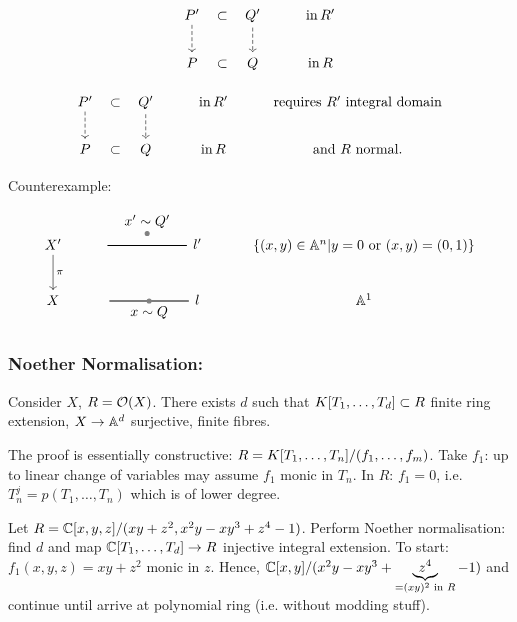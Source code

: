 \documentclass[a4paper,11pt]{article}
\begin{document}
{					
					\begin{equation*}
						\begin{tikzcd}
							P^\prime\ar[d,dashed]\ar[r,phantom,"\subset",description,black] & {\color{black}Q^\prime}\ar[d,dashed,black] & \mathrm{in}\, R^\prime\\
							P\ar[r,phantom,"\subset",description] & Q & \mathrm{in}\,R
						\end{tikzcd}
					\end{equation*}

					\begin{equation*}
						\begin{tikzcd}
							{\color{black}P^\prime}\ar[d,dashed,black]\ar[r,phantom,"\subset",description,black] & Q^\prime\ar[d,dashed] & \mathrm{in}\, R^\prime & \text{requires }R^\prime\text{ integral domain}\\
							P\ar[r,phantom,"\subset",description] & Q & \mathrm{in}\,R & \text{and } R \text{ normal}.
						\end{tikzcd}
					\end{equation*}

					Counterexample:
					\begin{equation*}
						\begin{tikzcd}
							X^\prime\ar[d,"\pi"] & \tikz[baseline=-.1cm]{\draw[thick](-1,0)--(1,0);\draw[thick,fill,gray](0,.3)circle[radius=.05cm];\node[above] at (0,.3){$x^\prime\sim Q^\prime$};\node[right] at (1,0){$l^\prime$}} & \{(x,y)\in\AA^n|y=0\text{ or }(x,y)=(0,1)\}\\
							X & \tikz[baseline=-.1cm]{\draw[thick](-1,0)--(1,0);\draw[thick,fill,gray](0,0)circle[radius=.05cm];\node[below] at (0,0){$x\sim Q$};\node[right] at (1,0){$l$}} & \AA^1
						\end{tikzcd}
					\end{equation*}

				\subsubsection*{Noether Normalisation:}

					Consider $X$, $R=\O(X)$. There exists $d$ such that $\K[d]\subset R$ finite ring extension, $X\rightarrow\AA^d$ surjective, finite fibres.
					
					\begin{remark}
						The proof is essentially constructive: $R=\K/(f_1,\dots,f_m)$. Take $f_1$: up to linear change of variables may assume $f_1$ monic in $T_n$. In $R$: $f_1=0$, i.e. $T_n^j=p(T_1,\dots,T_n)$ which is of lower degree.
					\end{remark}

					\begin{exc}
						Let $R=\CC[x,y,z]/(xy+z^2,x^2y-xy^3+z^4-1)$. Perform Noether normalisation: find $d$ and map $\CC[T_1,\dots,T_d]\rightarrow R$ injective integral extension. To start: $f_1(x,y,z)=xy+z^2$ monic in $z$. Hence, $\CC[x,y]/(x^2y-xy^3+\underbrace{z^4}_{=(xy)^2\text{ in }R}-1)$ and continue until arrive at polynomial ring (i.e. without modding stuff).
					\end{exc}
			
			}
\end{document}

